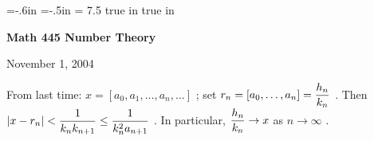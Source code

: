 \def\cmb{\MidnightBlue}	  %
\def\cnb{\NavyBlue}	  %
\def\crb{\RoyalBlue}	  %
\def\cce{\Cerulean}	  %
\def\ccy{\Cyan}		  %
\def\cpb{\ProcessBlue}	  %
\def\csb{\SkyBlue}	  %
\def\ctu{\Turquoise}	  %
\def\ctb{\TealBlue}	  %
\def\caq{\Aquamarine}	  %
\def\cbg{\BlueGreen}	  %
\def\cem{\Emerald}	  %
\def\cjg{\JungleGreen}	  %
\def\csg{\SeaGreen}	  %
\def\cgg{\Green}	  %
\def\cfg{\ForestGreen}	  %
\def\cpg{\PineGreen}	  %
\def\clg{\LimeGreen}	  %
\def\cyg{\YellowGreen}	  %
\def\cspg{\SpringGreen}	  %
\def\cog{\OliveGreen}	  %
\def\pars{\RawSienna}	  %
\def\cse{\Sepia}		  %
\def\cbr{\Brown}		  %
\def\cta{\Tan}		  %
\def\cgr{\Gray}		  %
\def\cbl{\Black}		  %
\def\cwh{\White}		  %


\voffset=-.6in
\hoffset=-.5in
\hsize = 7.5 true in
 true in


\overfullrule=0pt


\def\ctln{\centerline}
\def\u{\underbar}
\def\ssk{\smallskip}
\def\msk{\medskip}
\def\bsk{\bigskip}
\def\hsk{\hskip.1in}
\def\hhsk{\hskip.2in}
\def\dsl{\displaystyle}

\def\lra{$\Leftrightarrow$ }


\ctln{\bf Math 445 Number Theory}

\smallskip

\ctln{November 1, 2004}

\medskip

From last time: $x = [a_0,a_1,\ldots ,a_n,\ldots]$ ;  set $\dsl r_n = [a_0,\ldots , a_n] = {{h_n}\over{k_n}}$ .
Then $\dsl |x-r_n| < {{1}\over{k_n k_{n+1}}} \leq {{1}\over{k_n^2a_{n+1}}}$ . In particular, 
$\dsl {{h_n}\over{k_n}}\rightarrow x$ as $n\rightarrow \infty$ .

